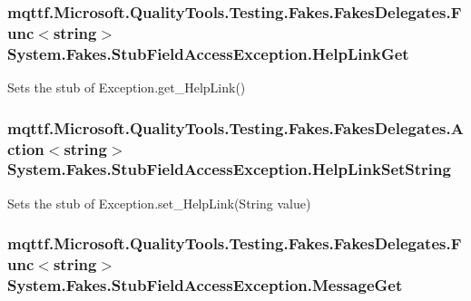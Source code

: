 \hypertarget{class_system_1_1_fakes_1_1_stub_field_access_exception_a216de85e88213182603864eabf239f41}{
\subsubsection[{Help\-Link\-Get}]{\setlength{\rightskip}{0pt plus 5cm}mqttf.\-Microsoft.\-Quality\-Tools.\-Testing.\-Fakes.\-Fakes\-Delegates.\-Func$<$string$>$ System.\-Fakes.\-Stub\-Field\-Access\-Exception.\-Help\-Link\-Get}}\label{class_system_1_1_fakes_1_1_stub_field_access_exception_a216de85e88213182603864eabf239f41}


Sets the stub of Exception.\-get\-\_\-\-Help\-Link()

\hypertarget{class_system_1_1_fakes_1_1_stub_field_access_exception_aef01ab4547d3dec3740afcb7ea255873}{
\subsubsection[{Help\-Link\-Set\-String}]{\setlength{\rightskip}{0pt plus 5cm}mqttf.\-Microsoft.\-Quality\-Tools.\-Testing.\-Fakes.\-Fakes\-Delegates.\-Action$<$string$>$ System.\-Fakes.\-Stub\-Field\-Access\-Exception.\-Help\-Link\-Set\-String}}\label{class_system_1_1_fakes_1_1_stub_field_access_exception_aef01ab4547d3dec3740afcb7ea255873}


Sets the stub of Exception.\-set\-\_\-\-Help\-Link(\-String value)

\hypertarget{class_system_1_1_fakes_1_1_stub_field_access_exception_ab1a487ea11c641be169ce93d18e1e023}{
\subsubsection[{Message\-Get}]{\setlength{\rightskip}{0pt plus 5cm}mqttf.\-Microsoft.\-Quality\-Tools.\-Testing.\-Fakes.\-Fakes\-Delegates.\-Func$<$string$>$ System.\-Fakes.\-Stub\-Field\-Access\-Exception.\-Message\-Get}}\label{class_system_1_1_fakes_1_1_stub_field_access_exception_ab1a487ea11c641be169ce93d18e1e023}


